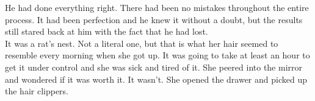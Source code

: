 \documentclass{standalone}
\begin{document}
	He had done everything right. There had been no mistakes throughout the entire process. It had been perfection and he knew it without a doubt, but the results still stared back at him with the fact that he had lost.\\
	
	It was a rat's nest. Not a literal one, but that is what her hair seemed to resemble every morning when she got up. It was going to take at least an hour to get it under control and she was sick and tired of it. She peered into the mirror and wondered if it was worth it. It wasn't. She opened the drawer and picked up the hair clippers.
	
\end{document}
